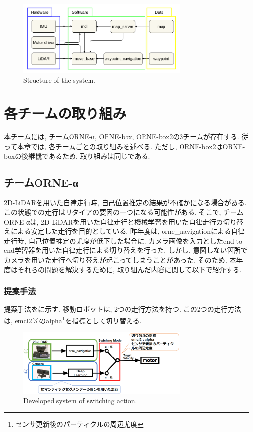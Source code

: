 \documentclass[uplatex, twocolumn, 9pt]{jsproceedings}
\begin{document}
\begin{figure}[h]
  \centering
  \includegraphics[width=85mm]{fig/software.pdf}
  \caption{Structure of the system.}
  \label{fig:soft-fig}%
\end{figure}

\section{各チームの取り組み}
本チームには, チームORNE-α, ORNE-box, ORNE-box2の3チームが存在する. 従って本章では, 各チームごとの取り組みを述べる. ただし, ORNE-box2はORNE-boxの後継機であるため, 取り組みは同じである.

\subsection{チームORNE-α}
2D-LiDARを用いた自律走行時, 自己位置推定の結果が不確かになる場合がある. この状態での走行はリタイアの要因の一つになる可能性がある. そこで, チームORNE-αは, 2D-LiDARを用いた自律走行と機械学習を用いた自律走行の切り替えによる安定した走行を目的としている. 昨年度は, orne\_navigationによる自律走行時, 自己位置推定の尤度が低下した場合に, カメラ画像を入力としたend-to-end学習器を用いた自律走行による切り替えを行った. しかし, 意図しない箇所でカメラを用いた走行へ切り替えが起こってしまうことがあった. そのため, 本年度はそれらの問題を解決するために, 取り組んだ内容に関して以下で紹介する. 

\subsubsection{提案手法}
提案手法をに示す. 移動ロボットは, 2つの走行方法を持つ. この2つの走行方法は, emcl2[3]のalpha\footnote[1]{センサ更新後のパーティクルの周辺尤度}を指標として切り替える.

\begin{figure}[h]
  \centering
  \includegraphics[width=85mm]{fig/kirikae.pdf}
  \caption{Developed system of switching action.}
  \label{fig:kirikae}%
\end{figure}
\end{document}
